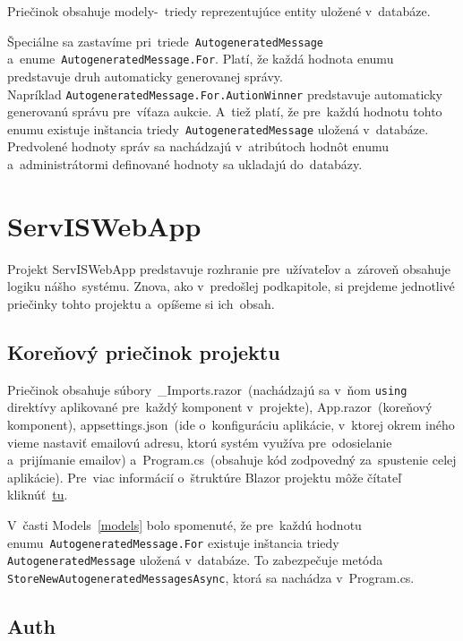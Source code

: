 Priečinok obsahuje modely-~triedy reprezentujúce entity uložené v~databáze.

Špeciálne sa zastavíme pri~triede~\verb|AutogeneratedMessage|\\a~enume~\verb|AutogeneratedMessage.For|. Platí, že každá hodnota enumu predstavuje druh automaticky generovanej správy.\\Napríklad \verb|AutogeneratedMessage.For.AutionWinner| predstavuje automaticky generovanú správu pre~víťaza aukcie. A~tiež platí, že pre~každú hodnotu tohto enumu existuje inštancia triedy~\verb|AutogeneratedMessage| uložená v~databáze.\\Pred\-vo\-le\-né hodnoty správ sa nachádzajú v~atribútoch hodnôt enumu a~administrátormi definované hodnoty sa ukladajú do~databázy.

\section{ServISWebApp}

Projekt ServISWebApp predstavuje rozhranie pre~užívateľov a~zároveň obsahuje logiku nášho~systému. Znova, ako v~predošlej podkapitole, si prejdeme jednotlivé priečinky tohto projektu a~opíšeme si ich~obsah.

\subsection{Koreňový priečinok projektu}

Priečinok obsahuje súbory~\_Imports.razor~(nachádzajú sa v~ňom \verb|using| direktívy aplikované pre~každý komponent v~projekte), App.razor~(koreňový komponent), appsettings.json~(ide o~konfiguráciu aplikácie, v~ktorej okrem iného vieme nastaviť emailovú adresu, ktorú systém využíva pre~odosielanie a~prijímanie emailov) a~Program.cs~(obsahuje kód zodpovedný za~spustenie celej aplikácie). Pre~viac informácií o~štruktúre Blazor projektu môže čítateľ kliknúť~\href{https://learn.microsoft.com/en-us/aspnet/core/blazor/project-structure?view=aspnetcore-7.0}{tu}.

V~časti Models~\ref{models} bolo spomenuté, že pre~každú hodnotu\\enumu~\verb|AutogeneratedMessage.For| existuje inštancia triedy\\\verb|AutogeneratedMessage| uložená v~databáze. To zabezpečuje metóda\\\verb|StoreNewAutogeneratedMessagesAsync|, ktorá sa nachádza v~Program.cs.

\subsection{Auth}

